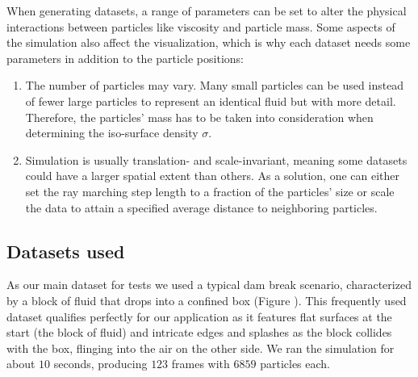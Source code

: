 When generating datasets, a range of parameters can be set to alter the physical interactions between particles like viscosity and particle mass. Some aspects of the simulation also affect the visualization, which is why each dataset needs some parameters in addition to the particle positions:
\begin{enumerate}
    \item The number of particles may vary. Many small particles can be used instead of fewer large particles to represent an identical fluid but with more detail. Therefore, the particles' mass has to be taken into consideration when determining the iso-surface density $\sigma$.
    \item Simulation is usually translation- and scale-invariant, meaning some datasets could have a larger spatial extent than others. As a solution, one can either set the ray marching step length to a fraction of the particles' size or scale the data to attain a specified average distance to neighboring particles.
\end{enumerate}

\subsection{Datasets used}



As our main dataset for tests we used a typical dam break scenario, characterized by a block of fluid that drops into a confined box (Figure ). This frequently used dataset qualifies perfectly for our application as it features flat surfaces at the start (the block of fluid) and intricate edges and splashes as the block collides with the box, flinging into the air on the other side. We ran the simulation for about $10$ seconds, producing $123$ frames with $6859$ particles each.

